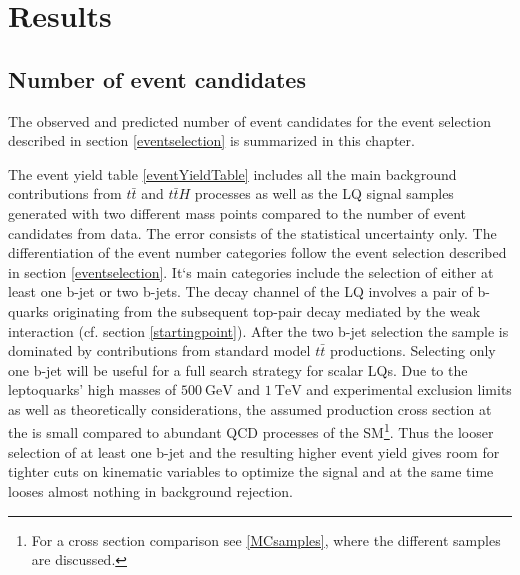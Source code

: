 \chapter{Results}\label{results}
\section{Number of event candidates}\label{eventYield}
The observed and predicted number of event candidates for the event selection described in section \ref{eventselection} is summarized in this chapter.\par
The event yield table \ref{eventYieldTable} includes all the main background contributions from $t\bar{t}$ and $t\bar{t}H$ processes as well as the LQ signal samples generated with two different mass points compared to the number of event candidates from data. The error consists of the statistical uncertainty only. The differentiation of the event number categories follow the event selection described in section \ref{eventselection}. It`s main categories include the selection of either at least one b-jet or two b-jets. The decay channel of the LQ involves a pair of b-quarks originating from the subsequent top-pair decay mediated by the weak interaction (cf. section \ref{startingpoint}). After the two b-jet selection the sample is dominated by contributions from standard model $t\bar{t}$ productions. Selecting only one b-jet will be useful for a full search strategy for scalar LQs. Due to the leptoquarks' high masses of $\SI{500}{\giga\electronvolt}$ and $\SI{1}{\tera\electronvolt}$ and experimental exclusion limits as well as theoretically considerations, the assumed production cross section at the {\LHC} is small compared to abundant QCD processes of the SM\footnote{For a cross section comparison see \ref{MCsamples}, where the different samples are discussed.}. Thus the looser selection of at least one b-jet and the resulting higher event yield gives room for tighter cuts on kinematic variables to optimize the signal and at the same time looses almost nothing in background rejection. \newline
%
